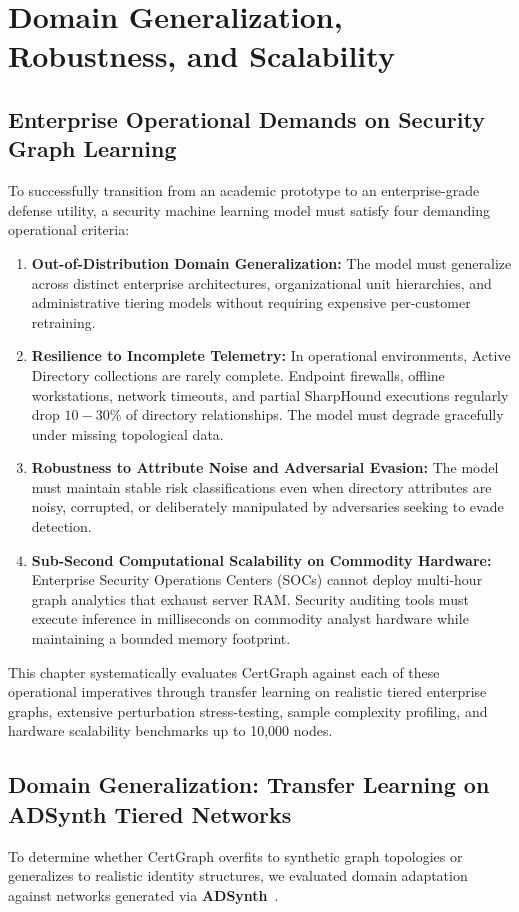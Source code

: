 \chapter{Domain Generalization, Robustness, and Scalability}
\label{ch:robustness}

\section{Enterprise Operational Demands on Security Graph Learning}
To successfully transition from an academic prototype to an enterprise-grade defense utility, a security machine learning model must satisfy four demanding operational criteria:
\begin{enumerate}
    \item \textbf{Out-of-Distribution Domain Generalization:} The model must generalize across distinct enterprise architectures, organizational unit hierarchies, and administrative tiering models without requiring expensive per-customer retraining.
    \item \textbf{Resilience to Incomplete Telemetry:} In operational environments, Active Directory collections are rarely complete. Endpoint firewalls, offline workstations, network timeouts, and partial SharpHound executions regularly drop $10-30\%$ of directory relationships. The model must degrade gracefully under missing topological data.
    \item \textbf{Robustness to Attribute Noise and Adversarial Evasion:} The model must maintain stable risk classifications even when directory attributes are noisy, corrupted, or deliberately manipulated by adversaries seeking to evade detection.
    \item \textbf{Sub-Second Computational Scalability on Commodity Hardware:} Enterprise Security Operations Centers (SOCs) cannot deploy multi-hour graph analytics that exhaust server RAM. Security auditing tools must execute inference in milliseconds on commodity analyst hardware while maintaining a bounded memory footprint.
\end{enumerate}

This chapter systematically evaluates CertGraph against each of these operational imperatives through transfer learning on realistic tiered enterprise graphs, extensive perturbation stress-testing, sample complexity profiling, and hardware scalability benchmarks up to 10,000 nodes.

\section{Domain Generalization: Transfer Learning on ADSynth Tiered Networks}
To determine whether CertGraph overfits to synthetic graph topologies or generalizes to realistic identity structures, we evaluated domain adaptation against networks generated via \textbf{ADSynth}~\cite{adsynth2024dsn}. 


